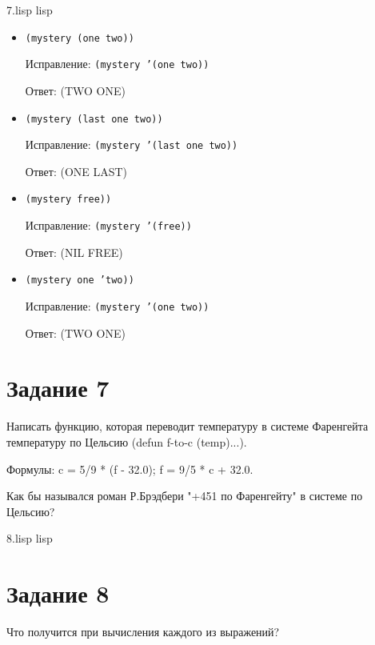 {7.lisp}
{lisp}
{}

\begin{itemize}
	\item \texttt{(mystery (one two))}
	
	Исправление: \texttt{(mystery '(one two))} 
	
	Ответ: (TWO ONE)
	
	\item \texttt{(mystery (last one two))}
	
	Исправление: \texttt{(mystery '(last one two))} 
	
	Ответ: (ONE LAST)
	
	\item \texttt{(mystery free))}
	
	Исправление: \texttt{(mystery '(free))} 
	
	Ответ: (NIL FREE)
	
	\item \texttt{(mystery one 'two))}
	
	Исправление: \texttt{(mystery '(one two))} 
	
	Ответ: (TWO ONE)
\end{itemize}

\section{Задание 7}
Написать функцию, которая переводит температуру в системе Фаренгейта температуру по Цельсию (defun f-to-c (temp)...).

Формулы: c = 5/9 * (f - 32.0); f = 9/5 * c + 32.0.

Как бы назывался роман Р.Брэдбери "+451 по Фаренгейту" в системе по Цельсию?

{8.lisp}
{lisp}
{}

\section{Задание 8}
Что получится при вычисления каждого из выражений?

